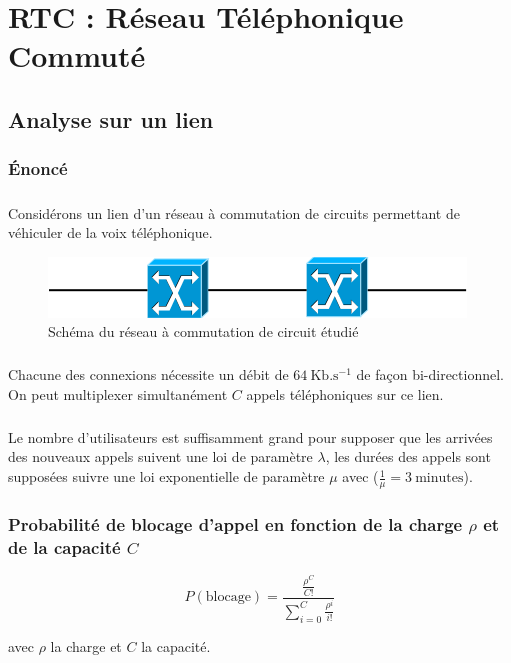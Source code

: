 %
\chapter{RTC : Réseau Téléphonique Commuté}
%
%
    \section{Analyse sur un lien}
        \label{seullien} %
%
        \subsection{Énoncé}
%
            \paragraph{}
Considérons un lien d'un réseau à commutation de circuits permettant de véhiculer de la voix téléphonique.
%
            \begin{figure}[h]
                \centering
                \includegraphics[scale=0.7]{RSC/1-1.png}
                \caption{ Schéma du réseau à commutation de circuit étudié }
                \label{ Schema du reseau a commutation de circuit }
            \end{figure}
%
            \paragraph{}
Chacune des connexions nécessite un débit de $64 \ \text{Kb}.\text{s}^{-1}$ de façon bi-directionnel.
On peut multiplexer simultanément $C$ appels téléphoniques sur ce lien.
%
            \paragraph{}
Le nombre d'utilisateurs est suffisamment grand pour supposer que les arrivées des nouveaux appels suivent une loi de paramètre $\lambda$, les durées des appels sont supposées suivre une loi exponentielle de paramètre $\mu$ avec ($\frac{1}{\mu} = 3 \ \text{minutes}$).
%
%
\clearpage
%
%
        \subsection{Probabilité de blocage d'appel en fonction de la charge $\rho$ et de la capacité $C$}
%
            \[ P(\text{blocage}) = \frac{ \frac{ \rho^C }{ C! } }{ \sum\limits_{i=0}^C \frac{ \rho^i }{ i! } } \]
%
            \begin{center}
                avec $\rho$ la charge et $C$ la capacité.
            \end{center}
%
